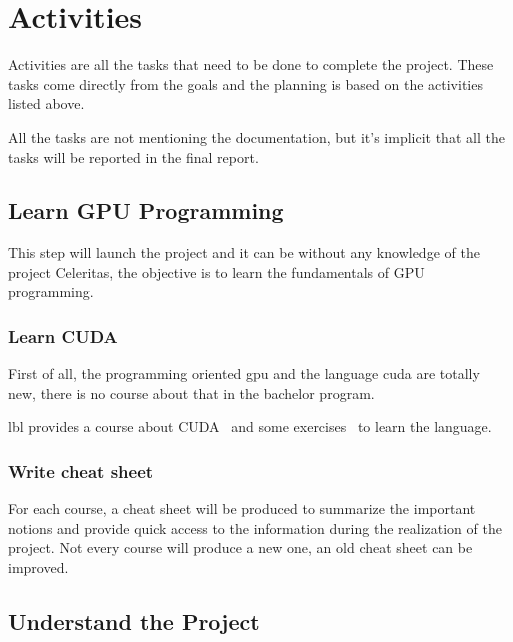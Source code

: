 \chapter{Activities}
\label{spec:ch:activities}

Activities are all the tasks that need to be done to complete the project.
These tasks come directly from the goals and the planning is based on the activities listed above.

All the tasks are not mentioning the documentation, but it's implicit that all the tasks will be reported in the final report.

\section{Learn GPU Programming}
\label{spec:ch:activities:learn-gpu-programming}

This step will launch the project and it can be without any knowledge of the project Celeritas, the objective is to learn the fundamentals of GPU programming.


\subsection{Learn CUDA}
\label{spec:ch:activities:learn-gpu-programming:learn-cuda}

First of all, the programming oriented \acrshort{gpu} and the language \acrshort{cuda} are totally new, there is no course about that in the bachelor program.

\acrlong{lbl} provides a course about CUDA~\cite{cuda-training} and some exercises~\cite{cuda-series} to learn the language.


\subsection{Write cheat sheet}
\label{spec:spec:ch:activities:learn-gpu-programming:write-cheat-sheet}

For each course, a cheat sheet will be produced to summarize the important notions and provide quick access to the information during the realization of the project.
Not every course will produce a new one, an old cheat sheet can be improved.


\section{Understand the Project}
\label{spec:ch:activities:understand-the-project}

